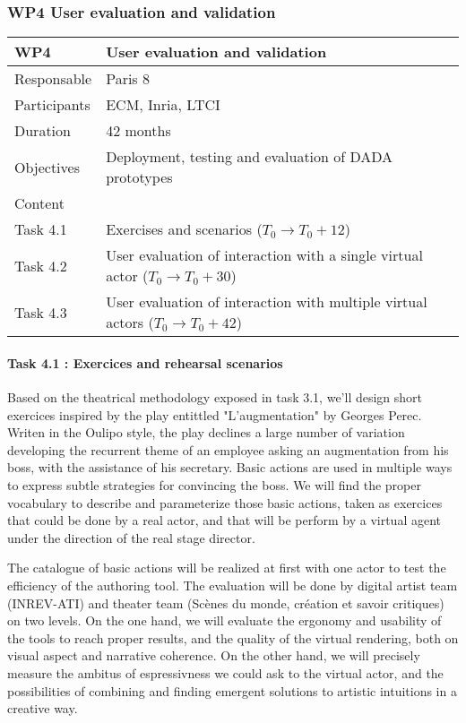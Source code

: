 \subsubsection{WP4 User evaluation and validation}


\begin{center}
\begin{tabular}{|l|l|}\hline
WP4 &  User evaluation and validation \\\hline
Responsable &  Paris 8  \\\hline
Participants &  ECM, Inria, LTCI\\\hline
Duration  &   42 months \\\hline
Objectives &  Deployment, testing and evaluation of DADA prototypes  \\\hline
Content &  \\\hline
Task 4.1 & Exercises and scenarios   ($T_0 \rightarrow  T_0+12$) \\\hline
Task 4.2 & User evaluation of interaction with a single virtual actor  ($T_0 \rightarrow  T_0+30$) \\\hline
Task 4.3 &  User evaluation of interaction with multiple virtual actors  ($T_0 \rightarrow  T_0+42$) \\\hline
\end{tabular}
\end{center}

\paragraph{Task 4.1 : Exercices and rehearsal scenarios}

Based on the theatrical methodology exposed in task 3.1, we'll design short exercices inspired by the play entittled  "L'augmentation" by Georges Perec. Writen in the Oulipo style, the play declines a large number of variation developing the recurrent theme of an employee asking an augmentation from his boss, with the assistance of his secretary.  Basic  actions are used in multiple ways to express subtle strategies for convincing the boss. We will find the proper vocabulary to describe and parameterize those basic actions, taken as exercices that could be done by a real actor, and that will be perform by a virtual agent under the direction of the real stage director. 

The catalogue of basic actions will be realized at first with one actor to test the efficiency of the authoring tool. The evaluation will be done by digital artist team (INREV-ATI) and theater team (Sc\`enes du monde, cr\'eation et savoir critiques) on two levels. On the one hand, we will evaluate the ergonomy and usability of the tools to reach proper results, and the quality of the virtual rendering, both on visual aspect and narrative coherence.  On the other hand, we will precisely measure the ambitus of espressivness we could ask to the virtual actor, and the possibilities of combining and finding emergent solutions to artistic intuitions in a creative way. 

